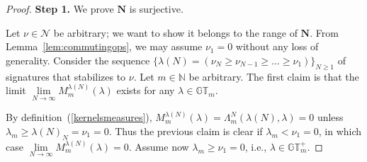 \documentclass[pdftex]{sigma}
\numberwithin{equation}{section}
\newcommand{\N}{\mathbb{N}}
\newcommand{\Nu}{\mathcal{N}}
\newcommand{\GT}{\mathbb{GT}}
\newcommand{\GTp}{\mathbb{GT}^+}
\newcommand{\NN}{\mathbf{N}}
\begin{document}
\begin{proof}
\textbf{Step 1.} We prove $\NN$ is surjective.

Let $\nu\in\Nu$ be arbitrary; we want to show it belongs to the range of $\NN$. From Lemma~\ref{lem:commutingops}, we may assume $\nu_1 = 0$ without any loss of generality.
Consider the sequence $\{\lambda(N) = (\nu_N \geq \nu_{N-1} \geq \dots \geq \nu_1)\}_{N\geq 1}$ of signatures that stabilizes to $\nu$. Let $m\in\N$ be arbitrary. The f\/irst claim is that the limit $\lim\limits_{N\rightarrow\infty}{M^{\lambda(N)}_m(\lambda)}$ exists for any $\lambda\in\GT_m$.

By def\/inition~(\ref{kernelsmeasures}), $M^{\lambda(N)}_m(\lambda) = \Lambda^N_m(\lambda(N), \lambda) = 0$ unless $\lambda_m \geq \lambda(N)_N = \nu_1 = 0$. Thus the previous claim is clear if $\lambda_m < \nu_1 = 0$, in which case $\lim\limits_{N\rightarrow\infty}{M^{\lambda(N)}_m(\lambda)} = 0$. Assume now $\lambda_m \geq \nu_1 = 0$, i.e., $\lambda\in\GTp_m$.


\end{proof}
\end{document}
